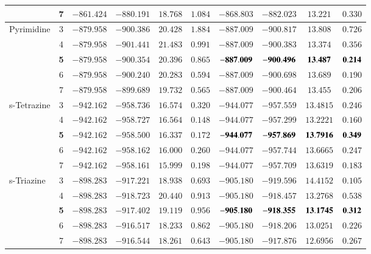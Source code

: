 \documentclass[aip,jcp,reprint,noshowkeys,superscriptaddress,floatfix]{revtex4-1}
\begin{document}
\begin{squeezetable}
\begin{table*}
\begin{ruledtabular}
\begin{tabular}{lccccccccc}
					&	7	&	$-861.424$	&	$-880.191$	&	$18.768$	&	$1.084$	&	$-868.803$	&	$-882.023$	&	$13.221$	&	$0.330$		\\
	\hline
	Pyrimidine		&	3	&	$-879.958$	&	$-900.386$	&	$20.428$	&	$1.884$	&	$-887.009$	&	$-900.817$	&	$13.808$	&	$0.726$		\\
					&	4	&	$-879.958$	&	$-901.441$	&	$21.483$	&	$0.991$	&	$-887.009$	&	$-900.383$	&	$13.374$	&	$0.356$		\\
					&\bf5	&	$-879.958$	&	$-900.354$	&	$20.396$	&	$0.865$	&$\bf-887.009$	&$\bf-900.496$	&$\bf13.487$	&$\bf0.214$		\\
					&	6	&	$-879.958$	&	$-900.240$	&	$20.283$	&	$0.594$	&	$-887.009$	&	$-900.698$	&	$13.689$	&	$0.190$		\\
					&	7	&	$-879.958$	&	$-899.689$	&	$19.732$	&	$0.565$	&	$-887.009$	&	$-900.464$	&	$13.455$	&	$0.206$		\\
	\hline
	s-Tetrazine		&	3	&	$-942.162$	&	$-958.736$	&	$16.574$	&	$0.320$	&	$-944.077$	&	$-957.559$	&	$13.4815$	&	$0.246$		\\
					&	4	&	$-942.162$	&	$-958.727$	&	$16.564$	&	$0.148$	&	$-944.077$	&	$-957.299$	&	$13.2221$	&	$0.160$		\\
					&\bf5	&	$-942.162$	&	$-958.500$	&	$16.337$	&	$0.172$	&$\bf-944.077$	&$\bf-957.869$	&$\bf13.7916$	&$\bf0.349$		\\
					&	6	&	$-942.162$	&	$-958.162$	&	$16.000$	&	$0.260$	&	$-944.077$	&	$-957.744$	&	$13.6665$	&	$0.247$		\\
					&	7	&	$-942.162$	&	$-958.161$	&	$15.999$	&	$0.198$	&	$-944.077$	&	$-957.709$	&	$13.6319$	&	$0.183$		\\
	\hline
	s-Triazine		&	3	&	$-898.283$	&	$-917.221$	&	$18.938$	&	$0.693$	&	$-905.180$	&	$-919.596$	&	$14.4152$	&	$0.105$		\\
					&	4	&	$-898.283$	&	$-918.723$	&	$20.440$	&	$0.913$	&	$-905.180$	&	$-918.457$	&	$13.2768$	&	$0.538$		\\
					&\bf5	&	$-898.283$	&	$-917.402$	&	$19.119$	&	$0.956$	&$\bf-905.180$	&$\bf-918.355$	&$\bf13.1745$	&$\bf0.312$		\\
					&	6	&	$-898.283$	&	$-916.517$	&	$18.233$	&	$0.862$	&	$-905.180$	&	$-918.206$	&	$13.0251$	&	$0.226$		\\
					&	7	&	$-898.283$	&	$-916.544$	&	$18.261$	&	$0.643$	&	$-905.180$	&	$-917.876$	&	$12.6956$	&	$0.267$		\\
	\end{tabular}
	\end{ruledtabular}
\end{table*}
\end{squeezetable}
\end{document}
